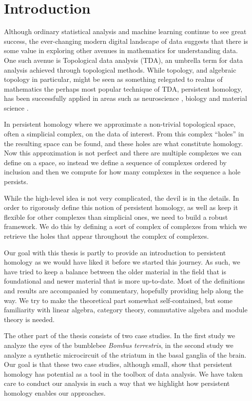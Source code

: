 \chapter{Introduction}
Although ordinary statistical analysis and machine learning continue to see great success, the ever-changing modern digital landscape of data suggests that there is some value in exploring other avenues in mathematics for understanding data. One such avenue is Topological data analysis (TDA), an umbrella term for data analysis achieved through topological methods. While topology, and algebraic topology in particular, might be seen as something relegated to realms of mathematics the perhaps most popular technique of TDA, persistent homology, has been successfully applied in areas such as neuroscience \cite{reimann}, biology \cite{plants} and material science \cite{moon2019}.

In persistent homology where we approximate a non-trivial topological space, often a simplicial complex, on the data of interest. From this complex ``holes'' in the resulting space can be found, and these holes are what constitute homology. Now this approximation is not perfect and there are multiple complexes we can define on a space, so instead we define a sequence of complexes ordered by inclusion and then we compute for how many complexes in the sequence a hole persists.

While the high-level idea is not very complicated, the devil is in the details. In order to rigorously define this notion of persistent homology, as well as keep it flexible for other complexes than simplicial ones, we need to build a robust framework. We do this by defining a sort of complex of complexes from which we retrieve the holes that appear throughout the complex of complexes.

Our goal with this thesis is partly to provide an introduction to persistent homology as we would have liked it before we started this journey. As such, we have tried to keep a balance between the older material in the field that is foundational and newer material that is more up-to-date. Most of the definitions and results are accompanied by commentary, hopefully providing help along the way. We try to make the theoretical part somewhat self-contained, but some familiarity with linear algebra, category theory, commutative algebra and module theory is needed.

The other part of the thesis consists of two case studies. In the first study we analyze the eyes of the bumblebee \textit{Bombus terrestris}, in the second study we analyze a synthetic microcircuit of the striatum in the basal ganglia of the brain. Our goal is that these two case studies, although small, show that persistent homology has potential as a tool in the toolbox of data analysis. We have taken care to conduct our analysis in such a way that we highlight how persistent homology enables our approaches.

